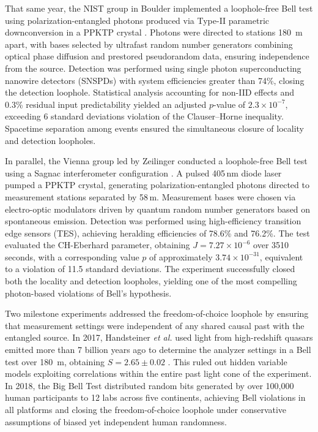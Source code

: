 \documentclass[aps,pra,reprint, superscriptaddress,showkeys]{revtex4-2}
\theoremstyle{plain}
\begin{document}
That same year, the NIST group in Boulder implemented a loophole-free Bell test using polarization-entangled photons produced via Type-II parametric downconversion in a PPKTP crystal \cite{Shalm2015}. Photons were directed to stations 180~m apart, with bases selected by ultrafast random number generators combining optical phase diffusion and prestored pseudorandom data, ensuring independence from the source. Detection was performed using single photon superconducting nanowire detectors (SNSPDs) with system efficiencies greater than 74\%, closing the detection loophole. Statistical analysis accounting for non-IID effects and 0.3\% residual input predictability yielded an adjusted $p$-value of $2.3 \times 10^{-7}$, exceeding 6 standard deviations violation of the Clauser–Horne inequality. Spacetime separation among events ensured the simultaneous closure of locality and detection loopholes.

In parallel, the Vienna group led by Zeilinger conducted a loophole-free Bell test using a Sagnac interferometer configuration \cite{Giustina2015}. A pulsed 405\,nm diode laser pumped a PPKTP crystal, generating polarization-entangled photons directed to measurement stations separated by 58\,m. Measurement bases were chosen via electro-optic modulators driven by quantum random number generators based on spontaneous emission. Detection was performed using high-efficiency transition edge sensors (TES), achieving heralding efficiencies of 78.6\% and 76.2\%. The test evaluated the CH-Eberhard parameter, obtaining $J = 7.27 \times 10^{-6}$ over 3510 seconds, with a corresponding value $p$ of approximately $3.74 \times 10^{-31}$, equivalent to a violation of 11.5 standard deviations. The experiment successfully closed both the locality and detection loopholes, yielding one of the most compelling photon-based violations of Bell’s hypothesis.

Two milestone experiments addressed the freedom-of-choice loophole by ensuring that measurement settings were independent of any shared causal past with the entangled source. In 2017, Handsteiner \textit{et al.} used light from high-redshift quasars emitted more than 7 billion years ago to determine the analyzer settings in a Bell test over 180~m, obtaining $S = 2.65 \pm 0.02$ \cite{Handsteiner2017}. This ruled out hidden variable models exploiting correlations within the entire past light cone of the experiment. In 2018, the Big Bell Test \cite{BigBellTest2018} distributed random bits generated by over 100,000 human participants to 12 labs across five continents, achieving Bell violations in all platforms and closing the freedom-of-choice loophole under conservative assumptions of biased yet independent human randomness.
\end{document}

